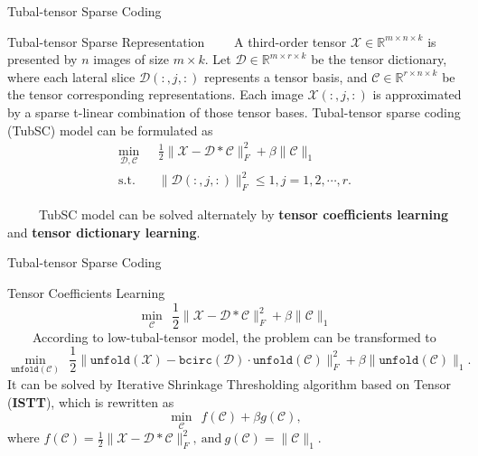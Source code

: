 \documentclass[t, 10pt, handout, aspectratio=169]{beamer}
\begin{document}
\begin{frame}{Tubal-tensor Sparse Coding}
\begin{block}{Tubal-tensor Sparse Representation}
~~~~A third-order tensor $\mathcal{X} \in \mathbb{R}^{m\times n\times k}$ is presented by $n$ images of size $m \times k$. Let $\mathcal{D} \in \mathbb{R}^{m\times r\times k}$ be the tensor dictionary, where each lateral slice $\mathcal{D}(:,j,:)$ represents a tensor basis, and $\mathcal{C}\in \mathbb{R}^{r\times n \times k}$ be the tensor corresponding representations. Each image $\mathcal{X}(:,j,:)$ is approximated by a sparse t-linear combination of those tensor bases. Tubal-tensor sparse coding (TubSC) model can be formulated as
$$
\begin{aligned}
\min_{\mathcal{D},\mathcal{C}}&~~~\frac{1}{2}\|\mathcal{X}-\mathcal{D}*\mathcal{C}\|_{F}^{2}+\beta\|\mathcal{C}\|_1 \\
\text{s.t.} &~~~ \|\mathcal{D}(:,j,:)\|_F^2\le 1, j=1,2,\cdots,r.
\end{aligned}
$$
\end{block}
~~~~~TubSC model can be solved alternately by \textbf{tensor coefficients learning} and \textbf{tensor dictionary learning}.
\end{frame}

\begin{frame}{Tubal-tensor Sparse Coding}
\begin{block}{Tensor Coefficients Learning}
$$
\min_{\mathcal{C}}~~\frac{1}{2}\|\mathcal{X}-\mathcal{D}*\mathcal{C}\|_F^2+\beta\|\mathcal{C}\|_1
$$
~~~~According to low-tubal-tensor model, the problem can be transformed to
$$
\min_{\texttt{unfold}(\mathcal{C})}~~\frac{1}{2}\|\texttt{unfold}(\mathcal{X})-\texttt{bcirc}(\mathcal{D})\cdot\texttt{unfold}(\mathcal{C})\|_F^2+\beta\|\texttt{unfold}(\mathcal{C})\|_1.
$$
It can be solved by Iterative Shrinkage Thresholding algorithm based on Tensor (\textbf{ISTT}), which is rewritten as
$$
\min_{\mathcal{C}}~~f(\mathcal{C})+\beta g(\mathcal{C}),
$$
where $f(\mathcal{C}) = \frac{1}{2}\|\mathcal{X}-\mathcal{D}*\mathcal{C}\|_F^2,~\text{and}~g(\mathcal{C}) = \|\mathcal{C}\|_1$.
\end{block}
\end{frame}
\end{document}
